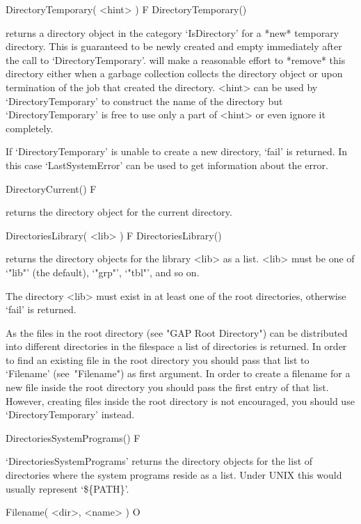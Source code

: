 \>DirectoryTemporary( <hint> ) F
\)DirectoryTemporary()

returns  a directory  object in the   category `IsDirectory' for a  *new*
temporary directory.   This is guaranteed to  be  newly created and empty
immediately  after the call to `DirectoryTemporary'.   {\GAP} will make a
reasonable effort   to *remove* this   directory  either  when a  garbage
collection  collects the directory   object  or upon termination  of  the
{\GAP}   job that   created  the  directory.     <hint> can  be  used  by
`DirectoryTemporary' to construct    the  name  of the    directory   but
`DirectoryTemporary' is free to use only a  part of <hint> or even ignore
it completely.

If `DirectoryTemporary' is  unable to create a  new  directory, `fail' is
returned.  In this case `LastSystemError' can be  used to get information
about the error.

\>DirectoryCurrent() F

returns the directory object for the current directory.

\>DirectoriesLibrary( <lib> ) F
\)DirectoriesLibrary()

returns the  directory objects  for  the  {\GAP}  library <lib> as a list.
<lib> must be one of `"lib"' (the default), `"grp"', `"tbl"', and so on.

The directory <lib> must exist in at  least one of the root directories,
otherwise `fail' is returned.

As the files in the {\GAP} root  directory (see "GAP Root Directory") can
be  distributed  into different  directories in the  filespace  a list of
directories is returned.  In order to find an existing file in the {\GAP}
root directory you should pass that list to `Filename' (see~"Filename")
as first argument.
In order to  create  a filename  for a  new file inside the  {\GAP}  root
directory you   should pass  the first  entry    of that list.   However,
creating files  inside the {\GAP} root  directory is not  encouraged, you
should use `DirectoryTemporary' instead.

\>DirectoriesSystemPrograms() F

`DirectoriesSystemPrograms' returns the directory objects for the list of
directories where  the system programs reside as a list.  Under UNIX this
would usually represent `\$\{PATH\}'.


\>Filename( <dir>, <name> ) O

